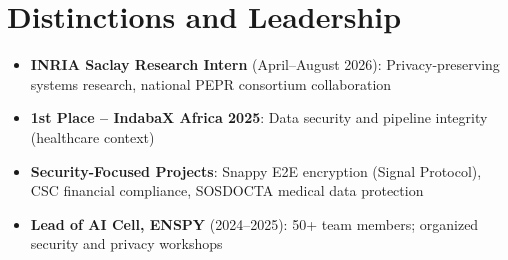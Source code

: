 \documentclass[a4paper,11pt]{article}
\begin{document}
\section{Distinctions and Leadership}
\begin{itemize}[leftmargin=*, nosep]
    \item \textbf{INRIA Saclay Research Intern} (April--August 2026): Privacy-preserving systems research, national PEPR consortium collaboration
    \item \textbf{1st Place -- IndabaX Africa 2025}: Data security and pipeline integrity (healthcare context)
    \item \textbf{Security-Focused Projects}: Snappy E2E encryption (Signal Protocol), CSC financial compliance, SOSDOCTA medical data protection
    \item \textbf{Lead of AI Cell, ENSPY} (2024--2025): 50+ team members; organized security and privacy workshops
\end{itemize}
\end{document}
